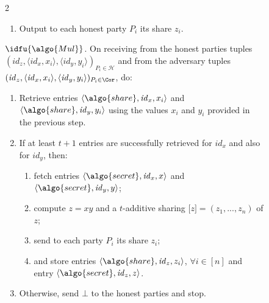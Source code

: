 \begin{figure}
\begin{minipage}{1.1\textwidth}
\begin{framed}
\begin{multicols}{2}
\begin{enumerate}
          \item Output to each honest party ${P}_i$ its share $z_i$.

        \end{enumerate}

        {$\idfu{\algo{Mul}}$.} On receiving from the honest parties tuples
        $(\mathit{id}_z, \langle \mathit{id}_x, x_i\rangle, \langle
        \mathit{id}_y,y_i\rangle)_{{P}_i \in \mathcal{H}}$ and from the
        adversary tuples $(\mathit{id}_z, \langle \mathit{id}_x, x_i \rangle,
        \langle \mathit{id}_y, y_i\rangle)_{{P}_i \in \Cor}$, do:

        \begin{enumerate}

          \item Retrieve entries $\langle \algo{share}, \mathit{id}_x,
            x_i\rangle$ and $\langle \algo{share}, \mathit{id}_y, y_i \rangle$
            using the values $x_i$ and $y_i$ provided in the previous step.

          \item If at least $t+1$ entries are successfully retrieved for
            $\mathit{id}_x$ and also for $\mathit{id}_y$, then:

            \begin{enumerate}

              \item fetch entries $\langle \algo{secret},
                \mathit{id}_x,x\rangle$ and $\langle \algo{secret},
                \mathit{id}_y,y\rangle$;

              \item compute $z = xy$ and a $t$-additive sharing $\lbrack z
                \rbrack  = (z_1, ..., z_n)$ of $z$;

              \item send to each party ${P}_i$ its share $z_i$;

              \item and store entries $\langle \algo{share}, \mathit{id}_z,
                z_i\rangle$, $\forall i \in [n]$ and entry $\langle
                \algo{secret}, \mathit{id}_z, z\rangle$.

            \end{enumerate}

          \item Otherwise, send $\bot$ to the honest parties and stop.

        \end{enumerate}


\end{multicols}
\end{framed}
\end{minipage}
\end{figure}
